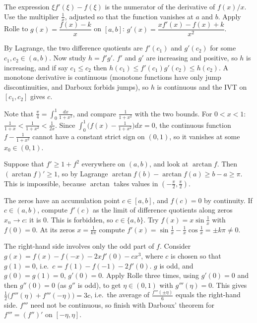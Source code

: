 \documentclass[11pt,a4paper]{article}
\begin{document}

 The expression $\xi f'(\xi)-f(\xi)$ is the numerator of the derivative of $f(x)/x$. Use the multiplier $\frac1x$, adjusted so that the function vanishes at $a$ and $b$.
 Apply Rolle to $g(x)=\dfrac{f(x)-k}{x}$ on $[a,b]$: $g'(x)=\dfrac{xf'(x)-f(x)+k}{x^2}$.

 By Lagrange, the two difference quotients are $f'(c_1)$ and $g'(c_2)$ for some $c_1,c_2\in(a,b)$. Now study $h=f'g'$.
 $f'$ and $g'$ are increasing and positive, so $h$ is increasing, and if say $c_1\le c_2$ then $h(c_1)\le f'(c_1)g'(c_2)\le h(c_2)$.
 A monotone derivative is continuous (monotone functions have only jump discontinuities, and Darboux forbids jumps), so $h$ is continuous and the IVT on $[c_1,c_2]$ gives $c$.

 Note that $\frac\pi4=\int_0^1\frac{dx}{1+x^2}$, and compare $\frac1{1+x^2}$ with the two bounds.
 For $0<x<1$: $\frac1{1+x}<\frac1{1+x^2}<\frac1{2x}$. Since $\int_0^1\bigl(f(x)-\frac1{1+x^2}\bigr)dx=0$, the continuous function $f-\frac1{1+x^2}$ cannot have a constant strict sign on $(0,1)$, so it vanishes at some $x_0\in(0,1)$.

 Suppose that $f'\ge1+f^2$ everywhere on $(a,b)$, and look at $\arctan f$.
 Then $(\arctan f)'\ge1$, so by Lagrange $\arctan f(b)-\arctan f(a)\ge b-a\ge\pi$. This is impossible, because $\arctan$ takes values in $(-\frac\pi2,\frac\pi2)$.

 The zeros have an accumulation point $c\in[a,b]$, and $f(c)=0$ by continuity.
 If $c\in(a,b)$, compute $f'(c)$ as the limit of difference quotients along zeros $x_n\to c$: it is $0$. This is forbidden, so $c\in\{a,b\}$.
 Try $f(x)=x\sin\frac1x$ with $f(0)=0$. At its zeros $x=\frac1{k\pi}$ compute $f'(x)=\sin\frac1x-\frac1x\cos\frac1x=\pm k\pi\ne0$.

 The right-hand side involves only the odd part of $f$. Consider $g(x)=f(x)-f(-x)-2xf'(0)-cx^3$, where $c$ is chosen so that $g(1)=0$, i.e.\ $c=f(1)-f(-1)-2f'(0)$.
 $g$ is odd, and $g(0)=g(1)=0$, $g'(0)=0$. Apply Rolle three times, using $g'(0)=0$ and then $g''(0)=0$ (as $g''$ is odd), to get $\eta\in(0,1)$ with $g'''(\eta)=0$.
 This gives $\frac12\bigl(f'''(\eta)+f'''(-\eta)\bigr)=3c$, i.e.\ the average of $\frac{f'''(\pm\eta)}6$ equals the right-hand side. $f'''$ need not be continuous, so finish with Darboux' theorem for $f'''=(f'')'$ on $[-\eta,\eta]$.
\end{document}
